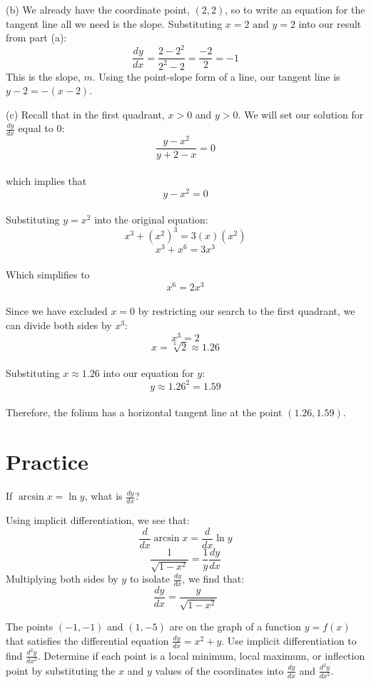 (b) We already have the coordinate point, $(2, 2)$, so to write an 
equation for the tangent line all we need is the slope. Substituting 
$x=2 \text{ and }y=2$ into our result from part (a):
$$\frac{dy}{dx}=\frac{2-2^2}{2^2-2}=\frac{-2}{2}=-1$$
This is the slope, $m$. Using the point-slope form of a line, our 
tangent line is $y-2=-(x-2)$. 

(c) Recall that in the first quadrant, $x > 0$ and $y > 0$. We will 
set our solution for $\frac{dy}{dx}$  equal to 0:
$$\frac{y-x^2}{y+2-x} = 0$$ \\
which implies that $$y - x^2 = 0$$ \\
Substituting $y = x^2$ into the original equation: 
$$x^3 + (x^2)^3 = 3(x)(x^2)$$ 
$$x^3 + x^6 = 3x^3$$ \\
Which simplifies to 
$$x^6 = 2x^3$$\\
Since we have excluded $x = 0$ by restricting our search to the first 
quadrant, we can divide both sides by $x^3$: 
$$x^3 = 2$$ 
$$x = \sqrt[3]{2} \approx 1.26$$\\
Substituting $x \approx 1.26$ into our equation for $y$: 
$$y \approx 1.26^2 = 1.59$$\\ 
Therefore, the folium has a horizontal tangent line at the point 
$(1.26, 1.59)$.

\section{Practice}
\begin{Exercise} If 
	$\arcsin{x} = \ln{y}$, what is $\frac{dy}{dx}$?
\end{Exercise}

\begin{Answer}[ref=implicit1]
	Using implicit differentiation, we see that:
	$$\frac{d}{dx}\arcsin{x} = \frac{d}{dx}\ln{y}$$
	$$\frac{1}{\sqrt{1-x^2}} = \frac{1}{y}\frac{dy}{dx}$$
	Multiplying both sides by $y$ to isolate $\frac{dy}{dx}$, we find that:
	$$\frac{dy}{dx} = \frac{y}{\sqrt{1-x^2}}$$
\end{Answer}

\begin{Exercise} The points 
	$(-1, -1)$ and $(1, -5)$ are on the graph of a function $y = f(x)$ 
	that satisfies the differential equation $\frac{dy}{dx} = x^2 + y$. 
	Use implicit differentiation to find $\frac{d^2y}{dx^2}$. Determine 
	if each point is a local minimum, local maximum, or inflection point 
	by substituting the $x$ and $y$ values of the coordinates into 
	$\frac{dy}{dx}$ and $\frac{d^2y}{dx^2}$. 
\end{Exercise}

